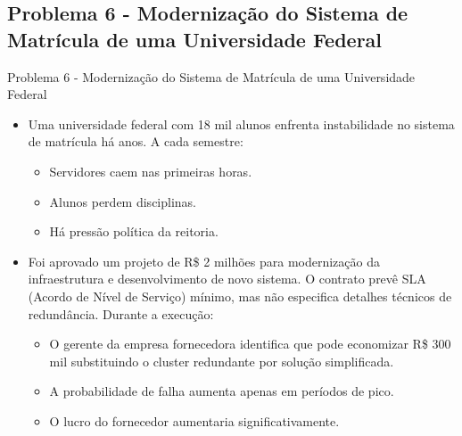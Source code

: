 \documentclass{beamer}
\begin{document}
\subsection{Problema 6 - Modernização do Sistema de Matrícula de uma Universidade Federal}

\begin{frame}{Problema 6 - Modernização do Sistema de Matrícula de uma Universidade Federal}
	\begin{itemize}
		\justifying
		\item Uma universidade federal com 18 mil alunos enfrenta instabilidade no sistema de matrícula há anos. A cada semestre:
			\begin{itemize}
				\item Servidores caem nas primeiras horas.
				\item Alunos perdem disciplinas.
				\item Há pressão política da reitoria.
			\end{itemize}
		\item Foi aprovado um projeto de R\$ 2 milhões para modernização da infraestrutura e desenvolvimento de novo sistema. O contrato prevê SLA (Acordo de Nível de Serviço) mínimo, mas não especifica detalhes técnicos de redundância. Durante a execução:
			\begin{itemize}
				\justifying
				\item O gerente da empresa fornecedora identifica que pode economizar R\$ 300 mil substituindo o cluster redundante por solução simplificada.
				\item A probabilidade de falha aumenta apenas em períodos de pico.
				\item O lucro do fornecedor aumentaria significativamente.
			\end{itemize}
	\end{itemize}
\end{frame}
\end{document}
